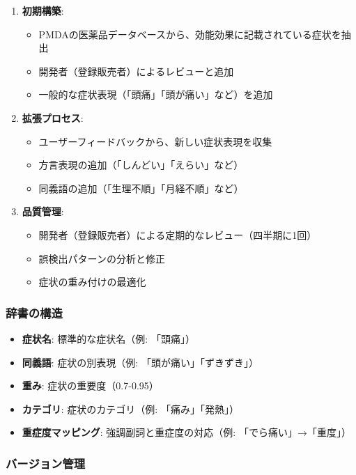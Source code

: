 \documentclass[a4paper,11pt,ja=standard,xelatex]{bxjsarticle}
\theoremstyle{definition}
\begin{document}
\begin{enumerate}
\item \textbf{初期構築}: 
  \begin{itemize}
  \item PMDAの医薬品データベースから、効能効果に記載されている症状を抽出
  \item 開発者（登録販売者）によるレビューと追加
  \item 一般的な症状表現（「頭痛」「頭が痛い」など）を追加
  \end{itemize}
\item \textbf{拡張プロセス}: 
  \begin{itemize}
  \item ユーザーフィードバックから、新しい症状表現を収集
  \item 方言表現の追加（「しんどい」「えらい」など）
  \item 同義語の追加（「生理不順」「月経不順」など）
  \end{itemize}
\item \textbf{品質管理}: 
  \begin{itemize}
  \item 開発者（登録販売者）による定期的なレビュー（四半期に1回）
  \item 誤検出パターンの分析と修正
  \item 症状の重み付けの最適化
  \end{itemize}
\end{enumerate}

\subsubsection{辞書の構造}

\begin{itemize}
\item \textbf{症状名}: 標準的な症状名（例: 「頭痛」）
\item \textbf{同義語}: 症状の別表現（例: 「頭が痛い」「ずきずき」）
\item \textbf{重み}: 症状の重要度（0.7-0.95）
\item \textbf{カテゴリ}: 症状のカテゴリ（例: 「痛み」「発熱」）
\item \textbf{重症度マッピング}: 強調副詞と重症度の対応（例: 「でら痛い」→「重度」）
\end{itemize}

\subsubsection{バージョン管理}
\end{document}
